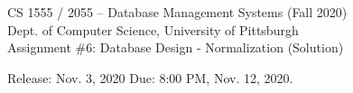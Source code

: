 \pagestyle{empty} \setlength{\textwidth}{6.5in}
\setlength{\topmargin}{-0.7in} \setlength{\textheight}{8.7in}
\setlength{\oddsidemargin}{.0in}
\setlength{\evensidemargin}{.0in} \setlength{\voffset}{10pt}


\begin{center}
{\large\sc CS 1555 / 2055 --  Database Management Systems (Fall 2020)} \\
{\sc Dept.  of Computer Science,  University of Pittsburgh} \\
\vspace*{0.25cm}
{\Large Assignment \#6: Database Design - Normalization (Solution)} \\
\end{center}
Release: Nov. 3, 2020 \hfill
Due: 8:00 PM, Nov. 12, 2020.\\
\-\hrulefill\- \newline

